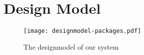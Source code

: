 \section{Design Model}
\begin{figure}[htbp]
    \centering
    \texttt{[image: designmodel-packages.pdf]}
    \caption{The designmodel of our system}
    \label{fig:designmodel1}
\end{figure}
